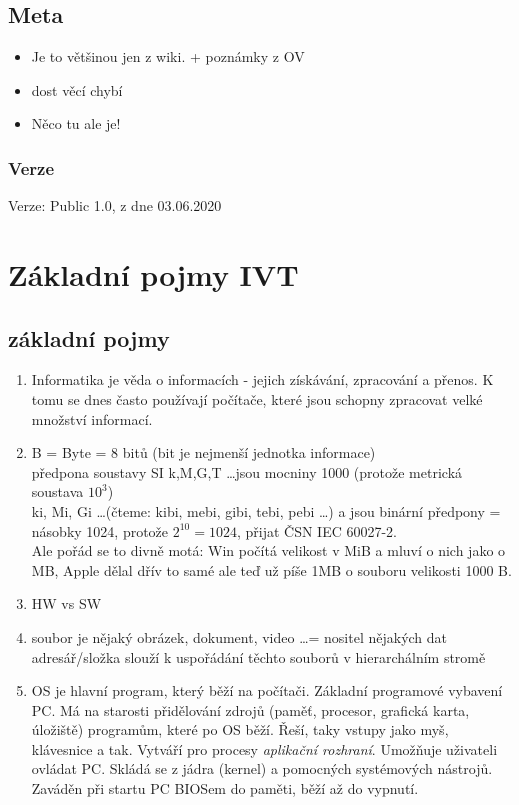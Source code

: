 \documentclass[12pt]{article}
\begin{document}
\rightline{\today}
\subsection{Meta}
\begin{itemize}
\item Je to většinou jen z wiki. + poznámky z OV
\item dost věcí chybí
\item Něco tu ale je!
\end{itemize}
\subsubsection{Verze}
Verze: Public 1.0, z dne 03.06.2020

\section{Základní pojmy IVT}
\subsection{základní pojmy}
\begin{enumerate}
\item Informatika je věda o informacích - jejich získávání, zpracování a přenos. K tomu se dnes často používají počítače, které jsou schopny zpracovat velké množství informací.
\item B = Byte = 8 bitů (bit je nejmenší jednotka informace)\\
předpona soustavy SI k,M,G,T \dots jsou mocniny 1000 (protože metrická soustava $10^3$)\\
ki, Mi, Gi \dots (čteme: kibi, mebi, gibi, tebi, pebi \dots) a jsou binární předpony = násobky 1024, protože $2^{10} = 1024$, přijat ČSN IEC 60027-2.\\
Ale pořád se to divně motá: Win počítá velikost v MiB a mluví o nich jako o MB, Apple dělal dřív to samé ale teď už píše 1MB o souboru velikosti 1000 B. 
\item HW vs SW
\item soubor je nějaký obrázek, dokument, video \dots  = nositel nějakých dat\\
adresář/složka slouží k uspořádání těchto souborů v hierarchálním stromě
\item OS je hlavní program, který běží na počítači. Základní programové vybavení PC. Má na starosti přidělování zdrojů (paměť, procesor, grafická karta, úložiště) programům, které po OS běží. Řeší, taky vstupy jako myš, klávesnice a tak. Vytváří pro procesy \emph{aplikační rozhraní}. Umožňuje uživateli ovládat PC. Skládá se z jádra (kernel) a pomocných systémových nástrojů. Zaváděn při startu PC BIOSem do paměti, běží až do vypnutí.
\end{enumerate}
\end{document}
